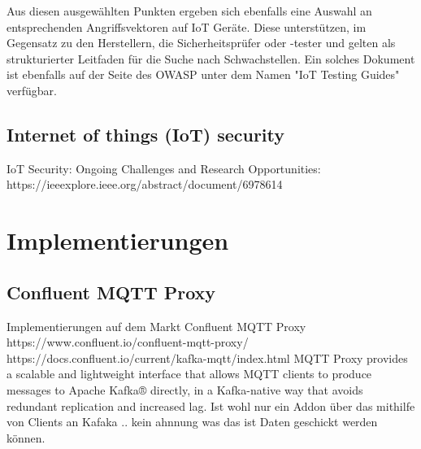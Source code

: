     Aus diesen ausgewählten Punkten ergeben sich ebenfalls eine Auswahl an entsprechenden Angriffsvektoren auf \ac{IoT} Geräte. Diese unterstützen, im Gegensatz zu den Herstellern, die Sicherheitsprüfer oder -tester und gelten als strukturierter Leitfaden für die Suche nach Schwachstellen. Ein solches Dokument ist ebenfalls auf der Seite des \ac{OWASP} unter dem Namen "IoT Testing Guides" %
    verfügbar.
    
    \subsection{Internet of things (IoT) security}
    IoT Security: Ongoing Challenges and Research Opportunities: https://ieeexplore.ieee.org/abstract/document/6978614
    

\section{Implementierungen}
    \subsection{Confluent MQTT Proxy}
    Implementierungen auf dem Markt
    Confluent MQTT Proxy
    https://www.confluent.io/confluent-mqtt-proxy/
    https://docs.confluent.io/current/kafka-mqtt/index.html
    MQTT Proxy provides a scalable and lightweight interface that allows MQTT clients to produce messages to Apache Kafka® directly, in a Kafka-native way that avoids redundant replication and increased lag.
    Ist wohl nur ein Addon über das mithilfe von Clients an Kafaka .. kein ahnnung was das ist Daten geschickt werden können.
    
